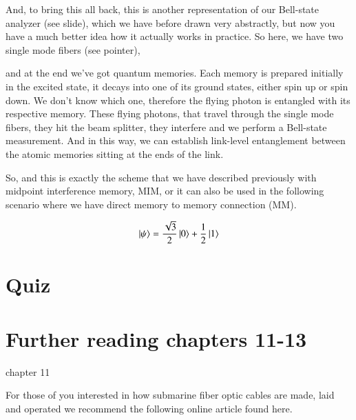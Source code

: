 And, to bring this all back, this is another representation of our Bell-state analyzer (see slide), which we have before drawn very abstractly, but now you have a much better idea how it actually works in practice. So here, we have two single mode fibers (see pointer),

and at the end we've got quantum memories. Each memory is prepared initially in the excited state, it decays into one of its ground states, either spin up or spin down. We don't know which one, therefore the flying photon is entangled with its respective memory. These flying photons, that travel through the single mode fibers, they hit the beam splitter, they interfere and we perform a Bell-state measurement. And in this way, we can establish link-level entanglement between the atomic memories sitting at the ends of the link.

So, and this is exactly the scheme that we have described previously with midpoint interference memory, MIM, or it can also be used in the following scenario where we have direct memory to memory connection (MM).



\newpage
\begin{exercises}
\begin{equation*}
\left| \psi \right\rangle = \frac{\sqrt{3}}{2}\left| 0 \right\rangle + \frac{1}{2}\left| 1 \right\rangle
\end{equation*}


\end{exercises}

\newpage
\section*{Quiz}


\section*{Further reading chapters 11-13}

chapter 11

For those of you interested in how submarine fiber optic cables are made, laid and operated we recommend the following online article found here.


